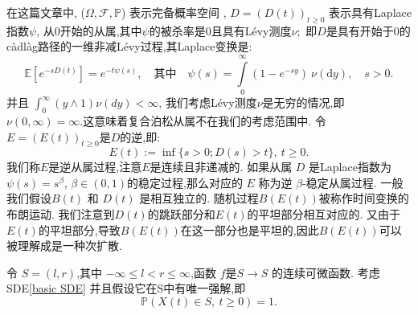 \documentclass[12pt,final]{article}
\numberwithin{equation}{section}
\numberwithin{figure}{section}
\numberwithin{table}{section}
\theoremstyle{plain}
\theoremstyle{Definition}
\theoremstyle{Remark}
\begin{document}
	在这篇文章中, ($\Omega,\mathcal{F},\mathbb{P}$) 表示完备概率空间 , $D=(D(t))_{t\geq0}$ 表示具有Laplace指数$\psi$, 从0开始的从属,其中$\psi$的被杀率是0且具有Lévy测度$\nu;$ 即$D$是具有开始于0的càdlàg路径的一维非减Lévy过程,其Laplace变换是:
	$$\mathbb{E}[e^{-sD(t)}]=e^{-t\psi(s)},\quad\text{其中}\quad\psi(s)=\int\limits_0^\infty(1-e^{-sy})\:\nu(\text{d}y),\quad s>0.$$
	并且 $\int_0^\infty(y\wedge1)\nu(dy) < \infty$,
	我们考虑Lévy测度$\nu$是无穷的情况,即$\nu ( 0,\infty ) = \infty$.这意味着复合泊松从属不在我们的考虑范围中. 令 $E=(E(t))_{t\geq0}$是$D$的逆,即:
	$$E(t):=\inf\{s>0;D(s)>t\},\:t\geq0. $$
	我们称$E$是逆从属过程,注意$E$是连续且非递减的. 如果从属 $D$ 是Laplace指数为$\psi(s) = s^{\beta}$, $\beta \in (0,1)$的稳定过程,那么对应的 $E$ 称为逆 $\beta$-稳定从属过程. 一般我们假设$B(t)$ 和 $D(t)$ 是相互独立的. 随机过程$B(E(t))$被称作时间变换的布朗运动. 我们注意到$D(t)$的跳跃部分和$E(t)$的平坦部分相互对应的. 又由于$E(t)$的平坦部分,导致$B(E(t))$在这一部分也是平坦的,因此$B(E(t))$可以被理解成是一种次扩散. 
	
	令 $S=(l,r)$,其中 $-\infty\leq l<r\leq\infty$,函数 $f$是$S\to S$ 的连续可微函数. 考虑SDE\cref{basic SDE}
	并且假设它在S中有唯一强解,即
	$$\mathbb{P}(X(t)\in S,\:t\geq0)=1. $$
	
\end{document}
